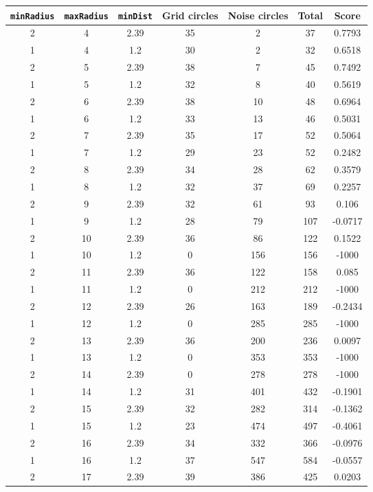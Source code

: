 \documentclass[letterpaper, 12pt]{article}
\begin{document}
\begin{longtable}{|c|c|c|c|c|c|c|}
\hline
\textbf{\texttt{minRadius}} & \textbf{\texttt{maxRadius}} & \textbf{\texttt{minDist}} & \textbf{Grid circles} & \textbf{Noise circles} & \textbf{Total} & \textbf{Score} \\
\hline
2 & 4 & 2.39 & 35 & 2 & 37 & 0.7793 \\
\hline
1 & 4 & 1.2 & 30 & 2 & 32 & 0.6518 \\
\hline
2 & 5 & 2.39 & 38 & 7 & 45 & 0.7492 \\
\hline
1 & 5 & 1.2 & 32 & 8 & 40 & 0.5619 \\
\hline
2 & 6 & 2.39 & 38 & 10 & 48 & 0.6964 \\
\hline
1 & 6 & 1.2 & 33 & 13 & 46 & 0.5031 \\
\hline
2 & 7 & 2.39 & 35 & 17 & 52 & 0.5064 \\
\hline
1 & 7 & 1.2 & 29 & 23 & 52 & 0.2482 \\
\hline
2 & 8 & 2.39 & 34 & 28 & 62 & 0.3579 \\
\hline
1 & 8 & 1.2 & 32 & 37 & 69 & 0.2257 \\
\hline
2 & 9 & 2.39 & 32 & 61 & 93 & 0.106 \\
\hline
1 & 9 & 1.2 & 28 & 79 & 107 & -0.0717 \\
\hline
2 & 10 & 2.39 & 36 & 86 & 122 & 0.1522 \\
\hline
1 & 10 & 1.2 & 0 & 156 & 156 & -1000 \\
\hline
2 & 11 & 2.39 & 36 & 122 & 158 & 0.085 \\
\hline
1 & 11 & 1.2 & 0 & 212 & 212 & -1000 \\
\hline
2 & 12 & 2.39 & 26 & 163 & 189 & -0.2434 \\
\hline
1 & 12 & 1.2 & 0 & 285 & 285 & -1000 \\
\hline
2 & 13 & 2.39 & 36 & 200 & 236 & 0.0097 \\
\hline
1 & 13 & 1.2 & 0 & 353 & 353 & -1000 \\
\hline
2 & 14 & 2.39 & 0 & 278 & 278 & -1000 \\
\hline
1 & 14 & 1.2 & 31 & 401 & 432 & -0.1901 \\
\hline
2 & 15 & 2.39 & 32 & 282 & 314 & -0.1362 \\
\hline
1 & 15 & 1.2 & 23 & 474 & 497 & -0.4061 \\
\hline
2 & 16 & 2.39 & 34 & 332 & 366 & -0.0976 \\
\hline
1 & 16 & 1.2 & 37 & 547 & 584 & -0.0557 \\
\hline
2 & 17 & 2.39 & 39 & 386 & 425 & 0.0203 \\

\end{longtable}
\end{document}

